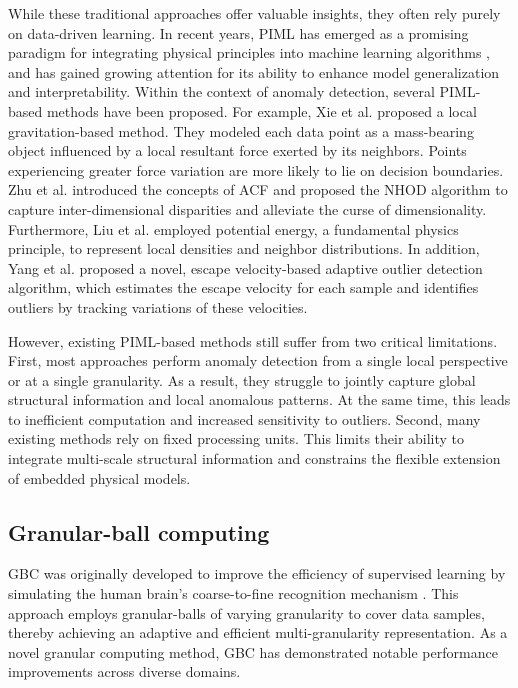 \documentclass[times, review, 10pt]{elsarticle}
\begin{document}
While these traditional approaches offer valuable insights, they often rely purely on data-driven learning. In recent years, PIML has emerged as a promising paradigm for integrating physical principles into machine learning algorithms
, and has gained growing attention for its ability to enhance model generalization and interpretability.
Within the context of anomaly detection, several PIML-based methods have been proposed. 
For example, Xie et al. \cite{xie2020local} proposed a local gravitation-based method. They modeled each data point as a mass-bearing object influenced by a local resultant force exerted by its neighbors. Points experiencing greater force variation are more likely to lie on decision boundaries. Zhu et al. \cite{zhu2022high} introduced the concepts of ACF and proposed the NHOD algorithm to capture inter-dimensional disparities and alleviate the curse of dimensionality. {Furthermore}, Liu et al. \cite{liu2025outlier} employed potential energy, a fundamental physics principle, to represent local densities and neighbor distributions. {In addition}, Yang et al. \cite{yang2025escape} proposed a novel, escape velocity-based adaptive outlier detection algorithm, which estimates the escape velocity for each sample and identifies outliers by tracking variations of these velocities. 

However, existing PIML-based methods still suffer from two critical limitations. 
{First, most approaches perform anomaly detection from a single local perspective or at a single granularity. As a result, they struggle to jointly capture global structural information and local anomalous patterns. At the same time, this leads to inefficient computation and increased sensitivity to outliers.
Second, many existing methods rely on fixed processing units. This limits their ability to integrate multi-scale structural information and constrains the flexible extension of embedded physical models.}

\subsection{Granular-ball computing}

GBC was originally developed to improve the efficiency of supervised learning by simulating the human brain’s coarse-to-fine recognition mechanism \cite{xia2019granular}. This approach employs granular-balls of varying granularity to cover data samples, thereby achieving an adaptive and efficient multi-granularity representation. As a novel granular computing method, GBC has demonstrated notable performance improvements across diverse domains.
\end{document}

